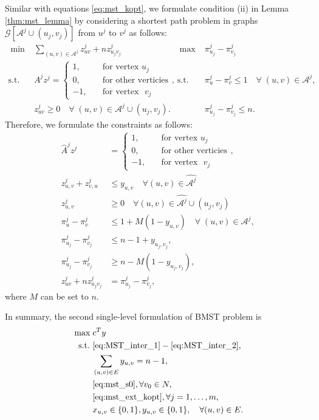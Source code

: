 \documentclass[11pt]{article}
\newcommand{\G}{\mathcal{G}}
\newcommand{\Aa}{\mathcal{A}}
\begin{document}
Similar with equations \ref{eq:mst_kopt}, we formulate condition (ii) in Lemma \ref{thm:mst_lemma} by considering a shortest path problem in graphs $\G[\Aa^j\cup (u_j, v_j)]$ from $u^j$ to $v^j$ as follows:
\begin{align*}
\;\min\;& \sum_{(u,v)\in \mathcal{A}^j} z^j_{uv} + nz_{u_jv_j}^j \hspace{50pt} &\;\max\; &\pi_{u_j}^j - \pi_{v_j}^j \\
\text{s.t.~~}& A^jz^j = \begin{cases}
1, \quad & \text{for vertex~} u_j \\
0, \quad & \text{for other verticies} \\
-1, \quad & \text{for vertex ~} v_j
\end{cases}, & \text{s.t.~~}& \pi_{u}^j - \pi_{v}^j \leq 1\quad\forall\; (u, v) \in \Aa^j,\\
& z_{uv}^j \geq 0 \quad\forall \; (u, v)\in \Aa^j\cup (u_j, v_j). && \pi^j_{u_j} - \pi^j_{v_j} \leq n.
\end{align*}
Therefore, we formulate the constraints as follows:
\begin{subequations} \label{eq:mst_ext_kopt}
	\begin{align}
	\hat{A}^jz^j & = \begin{cases}
	1, \quad & \text{for vertex~} u_j \\
	0, \quad & \text{for other verticies} \\
	-1, \quad & \text{for vertex ~} v_j
	\end{cases}, \\
	z^j_{u,v} + z^j_{v, u} & \leq y_{u,v} \quad \forall (u, v) \in \hat{\Aa^j} \\
	z^j_{u,v} & \geq 0 \quad \forall (u,v) \in \hat{\Aa^j} \cup (u_j, v_j) \\
	\pi_{u}^j - \pi_{v}^j & \leq 1 + M(1 - y_{u, v}) \quad\forall\; (u, v) \in \Aa^j, \\
	\pi^j_{u_j} - \pi^j_{v_j} & \leq n - 1 + y_{u_j,v_j}, \\
	\pi^j_{u_j} - \pi^j_{v_j} & \geq n - M(1 - y_{u_j,v_j}), \\
	z^j_{uv} + nz_{u_jv_j}^j & = \pi_{u_j}^j - \pi_{v_j}^j,
	\end{align}
\end{subequations}
where $M$ can be set to $n$.

In summary, the second single-level formulation of BMST problem is
\begin{align*}
[BMST_2]\;\max\;&  c^Ty \\
\text{s.t.~} & \eqref{eq:MST_inter_1} - \eqref{eq:MST_inter_2}, \\
& \sum_{(u, v) \in E} y_{u,v} = n - 1,\\
& \eqref{eq:mst_s0}, \forall v_0 \in N, \\
& \eqref{eq:mst_ext_kopt}, \forall j=1, \ldots, m, \\
& x_{u,v} \in \{0,1\}, y_{u,v} \in \{0, 1\}, \quad \forall (u,v) \in E.
\end{align*}
\end{document}
